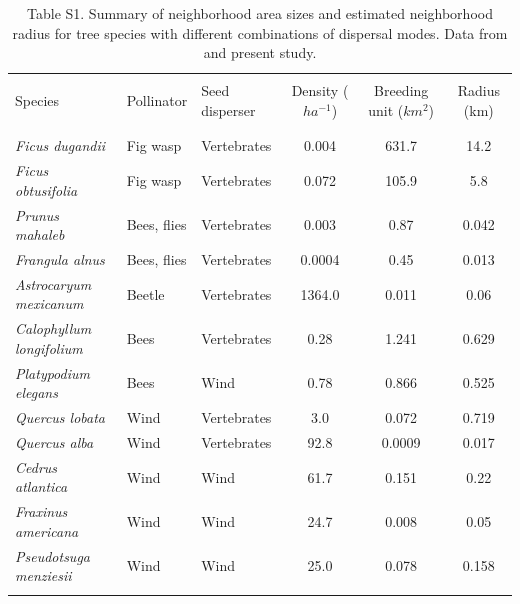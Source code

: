 \documentclass[a4paper, 12pt]{article}
\begin{document}
\begin{landscape}
\begin{table}
  \caption*{Table S1. Summary of neighborhood area sizes and estimated neighborhood radius for tree species with different combinations of dispersal modes. Data from \citet{Nason:1998aa,Smouse:2001aa,Garcia:2005fu,Garcia:2007he,Dutech:2005fk} and present study.}
  \vspace{0.5cm}
    \begin{tabular}{lllccc}
        \hline \\
     Species                & Pollinator  & Seed disperser & Density ($ha^{-1}$) & Breeding unit ($km^2$) & Radius (km) \\\\ \hline \\
    \textit{Ficus dugandii}          & Fig wasp    & Vertebrates    & 0.004          & 631.7               & 14.2        \\
    \textit{Ficus obtusifolia}       & Fig wasp    & Vertebrates    & 0.072          & 105.9               & 5.8         \\
    \textit{Prunus mahaleb}          & Bees, flies & Vertebrates    & 0.003          & 0.87                & 0.042       \\
    \textit{Frangula alnus}          & Bees, flies & Vertebrates    & 0.0004         & 0.45                & 0.013       \\
    \textit{Astrocaryum mexicanum}   & Beetle      & Vertebrates    & 1364.0         & 0.011               & 0.06        \\
    \textit{Calophyllum longifolium} & Bees        & Vertebrates    & 0.28           & 1.241               & 0.629       \\
    \textit{Platypodium elegans}     & Bees        & Wind           & 0.78           & 0.866               & 0.525       \\
    \textit{Quercus lobata}          & Wind        & Vertebrates    & 3.0
      & 0.072               & 0.719       \\ 
    \textit{Quercus alba}            & Wind        & Vertebrates    & 92.8
      & 0.0009              & 0.017       \\ 
    \textit{Cedrus atlantica}        & Wind        & Wind           & 61.7           & 0.151               & 0.22        \\
   \textit{Fraxinus americana}       & Wind        & Wind           & 24.7           & 0.008                & 0.05        \\
    \textit{Pseudotsuga menziesii}   & Wind        & Wind           & 25.0           & 0.078               & 0.158       \\\\
\hline
    \end{tabular}
\end{table}
\end{landscape}
\newpage 
\end{document}

